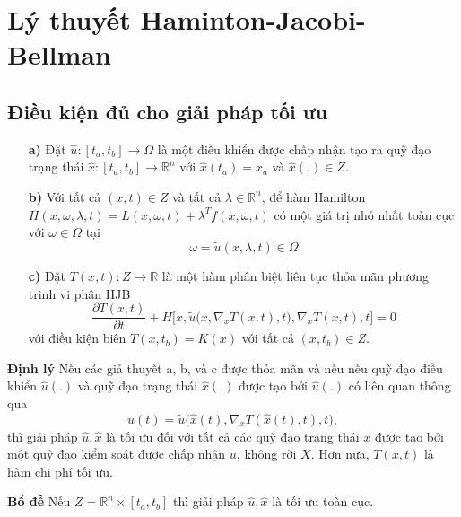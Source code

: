 \documentclass[11pt]{beamer}
\begin{document}
\section{Lý thuyết Haminton-Jacobi-Bellman}

\subsection{Điều kiện đủ cho giải pháp tối ưu}
\begin{frame}
	\begin{enumerate}
		\item[\textbf{a)}] Đặt $\hat{u}: [t_a, t_b] \to \Omega$ là một điều khiển được chấp nhận tạo ra quỹ đạo trạng thái $\hat{x}: [t_a, t_b] \to \mathbb{R}^n$ với $\hat{x}(t_a) = x_a$ và $\hat{x}(.) \in Z$.
		\item [\textbf{b)}] Với tất cả $(x, t) \in Z$ và tất cả $\lambda \in \mathbb{R}^n$, để hàm Hamilton $H(x, \omega, \lambda, t) = L(x, \omega, t) + \lambda^Tf(x, \omega, t)$ có một giá trị nhỏ nhất toàn cục với $\omega \in \Omega$ tại $$\omega = \tilde{u}(x, \lambda, t) \in \Omega $$
		\item[\textbf{c)}] Đặt $T(x, t): Z \to \mathbb{R}$ là một hàm phân biệt liên tục thỏa mãn phương trình vi phân HJB
		\begin{equation}
			\frac{\partial T(x, t)}{\partial t} + H\bigg[x, \tilde{u}\big(x, \nabla_xT(x, t), t\big), \nabla_xT(x, t), t\bigg] = 0
		\end{equation} với điều kiện biên $T(x, t_b) = K(x)$ với tất cả $(x, t_b) \in Z$.
	\end{enumerate}

\end{frame}

\begin{frame}
	\begin{block}{\textbf{Định lý}}
		Nếu các giả thuyết a, b, và c được thỏa mãn và nếu nếu quỹ đạo điều khiển $\hat{u}(.)$ và quỹ đạo trạng thái $\hat{x}(.)$ được tạo bởi $\hat{u}(.)$ có liên quan thông qua
		\begin{equation}
			\hat{u}(t) = \tilde{u}\big(\hat{x}(t), \nabla_xT(\hat{x}(t), t), t\big), 
		\end{equation}
		thì giải pháp $\hat{u}, \hat{x}$ là tối ưu đối với tất cả các quỹ đạo trạng thái $x$ được tạo bởi một quỹ đạo kiểm soát được chấp nhận $u$, không rời $X$. Hơn nữa, $T(x, t)$ là hàm chi phí tối ưu.
	\end{block}
	\begin{exampleblock}{\textbf{Bổ đề}}
		Nếu $Z = \mathbb{R}^n \times [t_a, t_b]$ thì giải pháp $\hat{u}, \hat{x}$ là tối ưu toàn cục.
	\end{exampleblock}
\end{frame}
\end{document}
